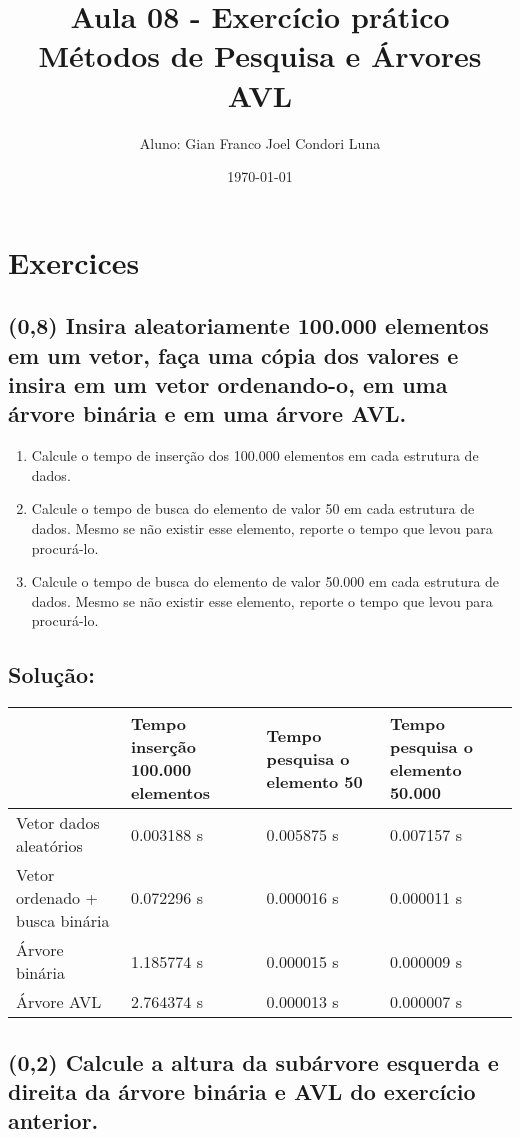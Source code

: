 \documentclass{article}
\title{Aula 08 - Exercício prático Métodos de Pesquisa e Árvores AVL}
\author{Aluno: Gian Franco Joel Condori Luna}
\date{\today}
\begin{document}
\maketitle

\section*{Exercices}
\setcounter{section}{1}
\subsection {(0,8) Insira aleatoriamente 100.000 elementos em um vetor, faça uma cópia dos
valores e insira em um vetor ordenando-o, em uma árvore binária e em uma árvore
AVL.}
\begin{enumerate}[label=\alph*)]
    \item Calcule o tempo de inserção dos 100.000 elementos em cada estrutura de dados.
    \item Calcule o tempo de busca do elemento de valor 50 em cada estrutura de dados.
    Mesmo se não existir esse elemento, reporte o tempo que levou para procurá-lo.
    \item Calcule o tempo de busca do elemento de valor 50.000 em cada estrutura de
    dados. Mesmo se não existir esse elemento, reporte o tempo que levou para
    procurá-lo.
\end{enumerate}

\subsection*{Solução:}

\begin{tabularx}{\textwidth}{|X|X|X|X|} 
  \hline
   & 
   Tempo inserção 100.000 elementos & 
   Tempo pesquisa o elemento 50 & 
   Tempo pesquisa o elemento 50.000 \\ 
  \hline
  Vetor dados aleatórios & 0.003188 s  & 0.005875 s  & 0.007157 s  \\ \hline
  Vetor ordenado + busca binária & 0.072296 s  & 0.000016 s  & 0.000011 s  \\ \hline
  Árvore binária & 1.185774 s  & 0.000015 s  & 0.000009 s  \\ \hline
  Árvore AVL & 2.764374 s  & 0.000013 s  & 0.000007 s  \\ \hline
\end{tabularx}

\subsection {(0,2) Calcule a altura da subárvore esquerda e direita da árvore binária e AVL do
exercício anterior.}
\end{document}

